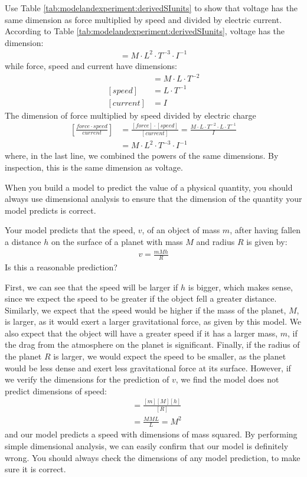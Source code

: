 \begin{example}{Use Table \ref{tab:modelandexperiment:derivedSIunits} to show that voltage has the same dimension as force multiplied by speed and divided by electric current.}
According to Table \ref{tab:modelandexperiment:derivedSIunits}, voltage has the dimension:
\begin{align*}
[voltage]=M\cdot L^2 \cdot T^{-3}\cdot I^{-1}
\end{align*}
while force, speed and current have dimensions:
\begin{align*}
[force]&=M\cdot L\cdot T^{-2} \\
[speed]&=L\cdot T^{-1}\\
[current]&=I
\end{align*}
The dimension of force multiplied by speed divided by electric charge
\begin{align*}
\left[\frac{force\cdot speed}{current}\right]&=\frac{[force]\cdot [speed]}{[current]}=\frac{M\cdot L\cdot T^{-2} \cdot L\cdot T^{-1} }{I}\\
&=M\cdot L^2 \cdot T^{-3}\cdot I^{-1}
\end{align*}
where, in the last line, we combined the powers of the same dimensions. By inspection, this is the same dimension as voltage.
\end{example}

When you build a model to predict the value of a physical quantity, you should always use dimensional analysis to ensure that the dimension of the quantity your model predicts is correct.

\begin{example}{Your model predicts that the speed, $v$, of an object of mass $m$, after having fallen a distance $h$ on the surface of a planet with mass $M$ and radius $R$ is given by:
\begin{align*}
v = \frac{mMh}{R}
\end{align*}
Is this a reasonable prediction?
}

First, we can see that the speed will be larger if $h$ is bigger, which makes sense, since we expect the speed to be greater if the object fell a greater distance. Similarly, we expect that the speed would be higher if the mass of the planet, $M$, is larger, as it would exert a larger gravitational force, as given by this model. We also expect that the object will have a greater speed if it has a larger mass, $m$, if the drag from the atmosphere on the planet is significant. Finally, if the radius of the planet $R$ is larger, we would expect the speed to be smaller, as the planet would be less dense and exert less gravitational force at its surface. However, if we verify the dimensions for the prediction of $v$, we find the model does not predict dimensions of speed:
\begin{align*}
[v] &= \frac{[m][M][h]}{[R]}\\
&=\frac{MML}{L}=M^2
\end{align*} 
and our model predicts a speed with dimensions of mass squared. By performing simple dimensional analysis, we can easily confirm that our model is definitely wrong. You should always check the dimensions of any model prediction, to make sure it is correct.
\end{example}

